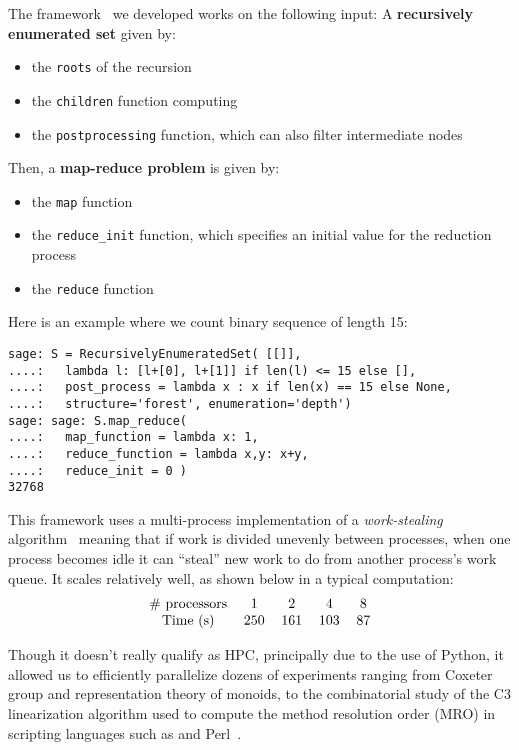 \documentclass{deliverablereport}
\begin{document}
The framework~\cite{map-reduce} we developed works on the following input:
A \textbf{recursively enumerated set} given by:
\begin{itemize}
\item the \texttt{roots} of the recursion
\item the \texttt{children} function computing 
\item the \texttt{postprocessing} function, which can also filter intermediate 
  nodes
\end{itemize}
Then, a \textbf{map-reduce problem} is given by:
\begin{itemize}
\item the \texttt{map} function
\item the \verb|reduce_init| function, which specifies an initial value for
    the reduction process
\item the \texttt{reduce} function
\end{itemize}
Here is an example where we count binary sequence of length 15:
\begin{verbatim}
sage: S = RecursivelyEnumeratedSet( [[]],
....:   lambda l: [l+[0], l+[1]] if len(l) <= 15 else [],
....:   post_process = lambda x : x if len(x) == 15 else None,
....:   structure='forest', enumeration='depth') 
sage: sage: S.map_reduce(
....:   map_function = lambda x: 1,
....:   reduce_function = lambda x,y: x+y,
....:   reduce_init = 0 )
32768
\end{verbatim}
This framework uses a multi-process implementation of a {\em work-stealing}
algorithm~\cite{BlumofeL99, BlumofeL99} meaning that if work is divided
unevenly between processes, when one process becomes idle it can ``steal'' new
work to do from another process's work queue.  It scales relatively well, as
shown below in a typical computation:
\[\begin{tabular}{ccccc}
\# processors & 1 & 2 & 4 & 8 \\
Time (s) & 250& 161& 103 & 87 \\
\end{tabular}
\]

Though it doesn't really qualify as HPC, principally due to the use of Python,
it allowed us to efficiently parallelize dozens of experiments ranging from
Coxeter group and representation theory of monoids, to the combinatorial study
of the C3 linearization algorithm used to compute the method resolution order
(MRO) in scripting languages such as \Python and Perl~\cite{C3-controled}.
\end{document}
